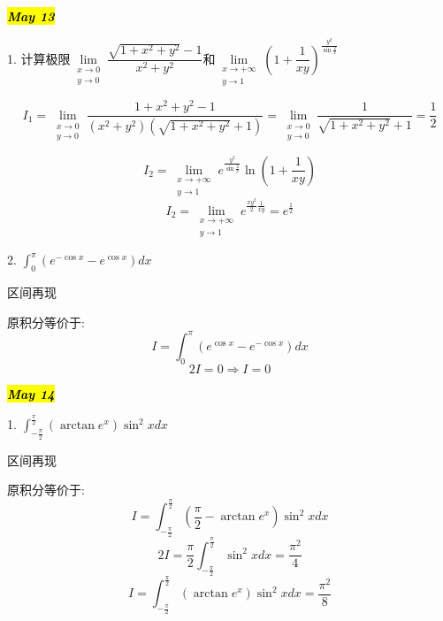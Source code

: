 \hl{\textbf{\textit{May 13}}}

1. 计算极限$\lim\limits_{\substack{x\rightarrow 0\\ y\rightarrow 0}}\dfrac{\sqrt{1+x^2+y^2}-1}{x^2+y^2}$和$\lim\limits_{\substack{x\rightarrow +\infty\\ y\rightarrow 1}}\left( 1+\dfrac{1}{xy}\right)^{\frac{y^2}{\sin\frac{2}{x}}} $
\begin{solution}
	$$I_{1}=\lim\limits_{\substack{x\rightarrow 0\\ y\rightarrow 0}}\dfrac{1+x^2+y^2-1}{(x^2+y^2)(\sqrt{1+x^2+y^2}+1)}=\lim\limits_{\substack{x\rightarrow 0\\ y\rightarrow 0}}\dfrac{1}{\sqrt{1+x^2+y^2}+1}=\frac{1}{2}$$
	
	$$I_{2}=\lim\limits_{\substack{x\rightarrow +\infty\\ y\rightarrow 1}}e^{\frac{y^2}{\sin\frac{2}{x}}}\ln(1+\frac{1}{xy})$$
	$$I_{2}=\lim\limits_{\substack{x\rightarrow +\infty\\ y\rightarrow 1}}e^{\frac{xy^2}{2}\frac{1}{xy}}=e^{\frac{1}{2}}$$
\end{solution}

2. $\int_{0}^{\pi}\left( e^{-\cos x}-e^{\cos x}\right)dx $
\begin{solution}
	
	区间再现
	
	原积分等价于: 
	$$I=\int_{0}^{\pi}\left( e^{\cos x}-e^{-\cos x}\right)dx$$
	$$2I=0\Rightarrow I=0$$
\end{solution}

\hl{\textbf{\textit{May 14}}}

1. $\int_{-\frac{\pi}{2}}^{\frac{\pi}{2}}\left( \arctan e^{x}\right)\sin^{2}xdx $
\begin{solution}
	
	区间再现
	
	原积分等价于: 
	$$I=\int_{-\frac{\pi}{2}}^{\frac{\pi}{2}}(\frac{\pi}{2}-\arctan e^{x})\sin^{2}xdx$$
	$$2I=\frac{\pi}{2}\int_{-\frac{\pi}{2}}^{\frac{\pi}{2}}\sin^{2}xdx=\frac{\pi^{2}}{4}$$
	$$I=\int_{-\frac{\pi}{2}}^{\frac{\pi}{2}}\left( \arctan e^{x}\right)\sin^{2}xdx=\frac{\pi^{2}}{8}$$
\end{solution}

